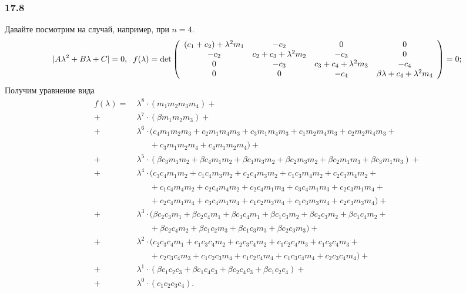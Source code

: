 \subsubsection*{17.8}

Давайте посмотрим на случай, например, при $n=4$. 
\begin{equation*}
    |A \lambda^2 + B \lambda + C| = 0,
    \hspace{0.2 cm}
    f(\lambda) = 
    \det 
    \left(
    \begin{array}{cccc}
     ({c_1}+{c_2})+\lambda ^2 {m_1} & -{c_2} & 0 & 0 \\
     -{c_2} & {c_2}+{c_3}+\lambda ^2 {m_2} & -{c_3} & 0 \\
     0 & -{c_3} & {c_3}+{c_4}+\lambda ^2 {m_3} & -{c_4} \\
     0 & 0 & -{c_4} & \beta  \lambda +{c_4}+\lambda ^2 {m_4} \\
    \end{array}
    \right) = 0;
\end{equation*}
Получим уравнение вида
\begin{align*}
    f (\lambda) =\  &\lambda^8 \cdot
    (m_1 m_2 m_3 m_4)
    + \\
    + &\lambda^7 \cdot
    (\beta  m_1 m_2 m_3)
    + \\
    + &\lambda^6 \cdot
    (c_4 m_1 m_2 m_3+c_2 m_1 m_4 m_3+c_3 m_1 m_4 m_3+c_1 m_2 m_4 m_3+c_2 m_2 m_4 m_3
    + \\ 
        &\phantom{\lambda^4 \cdot} +
    c_3 m_1 m_2 m_4+c_4 m_1 m_2 m_4)
    + \\
    + &\lambda^5 \cdot
    (
        \beta  c_3 m_1 m_2+\beta  c_4 m_1 m_2+\beta  c_1 m_3 m_2+\beta  c_2 m_3 m_2+\beta  c_2 m_1 m_3+\beta  c_3 m_1 m_3
    ) + \\
    + &\lambda^4 \cdot
    (
        c_3 c_4 m_1 m_2+c_1 c_4 m_3 m_2+c_2 c_4 m_3 m_2+c_1 c_3 m_4 m_2+c_2 c_3 m_4 m_2
        + \\ 
        &\phantom{\lambda^4 \cdot} +
        c_1 c_4 m_4 m_2+c_2 c_4 m_4 m_2+c_2 c_4 m_1 m_3 + c_3 c_4 m_1 m_3+c_2 c_3 m_1 m_4
        + \\ 
        &\phantom{\lambda^4 \cdot} +
        c_2 c_4 m_1 m_4+c_3 c_4 m_1 m_4+c_1 c_2 m_3 m_4+c_1 c_3 m_3 m_4+c_2 c_3 m_3 m_4
    ) + \\
    + &\lambda^3 \cdot
    (
        \beta  c_2 c_3 m_1+\beta  c_2 c_4 m_1+\beta  c_3 c_4 m_1+\beta  c_1 c_3 m_2+\beta  c_2 c_3 m_2+\beta  c_1 c_4 m_2
        + \\ 
        &\phantom{\lambda^4 \cdot} +
        \beta  c_2 c_4 m_2+\beta  c_1 c_2 m_3+\beta  c_1 c_3 m_3+\beta  c_2 c_3 m_3
    ) + \\
    + &\lambda^2 \cdot
    (
        c_2 c_3 c_4 m_1+c_1 c_3 c_4 m_2+c_2 c_3 c_4 m_2+c_1 c_2 c_4 m_3+c_1 c_3 c_4 m_3
        + \\ 
        &\phantom{\lambda^4 \cdot} +
        c_2 c_3 c_4 m_3+c_1 c_2 c_3 m_4+c_1 c_2 c_4 m_4+c_1 c_3 c_4 m_4+c_2 c_3 c_4 m_4
    ) + \\
    + &\lambda^1 \cdot
    (
        \beta  c_1 c_2 c_3+\beta  c_1 c_4 c_3+\beta  c_2 c_4 c_3+\beta  c_1 c_2 c_4
    ) + \\
    + &\lambda^0 \cdot
    (
        c_1 c_2 c_3 c_4
    ).
\end{align*}
